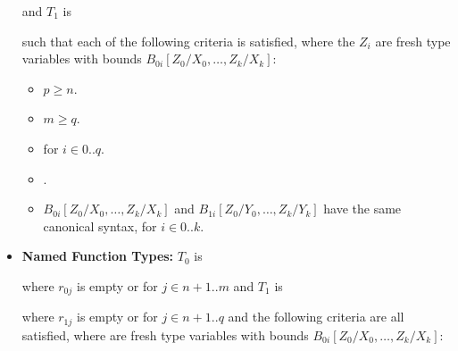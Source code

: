 \documentclass[makeidx]{article}
\begin{document}
\begin{itemize}

  and $T_1$ is


  such that each of the following criteria is satisfied,
  where the $Z_i$ are fresh type variables with bounds
  $B_{0i}[Z_0/X_0, \ldots, Z_k/X_k]$:

  \begin{itemize}
  \item $p \geq n$.
  \item $m \geq q$.
  \item {}
    for $i \in 0 .. q$.
  \item {}.
  \item $B_{0i}[Z_0/X_0, \ldots, Z_k/X_k]$ and $B_{1i}[Z_0/Y_0, \ldots, Z_k/Y_k]$
    have the same canonical syntax, for $i \in 0 .. k$.
  \end{itemize}
\item
  \textbf{Named Function Types:}
  $T_0$ is


  where $r_{0j}$ is empty or \REQUIRED{} for $j \in n+1 .. m$
  and $T_1$ is


  where $r_{1j}$ is empty or \REQUIRED{} for $j \in n+1 .. q$
  and the following criteria are all satisfied,
  where  are fresh type variables with bounds
  $B_{0i}[Z_0/X_0, \ldots, Z_k/X_k]$:


\end{itemize}
\end{document}
